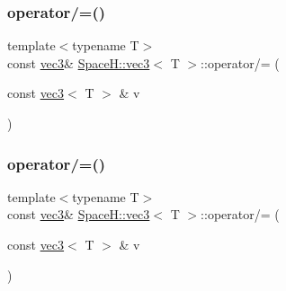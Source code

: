 \mbox{\label{struct_space_h_1_1vec3_a0de32a9762524bf50e592c5a463c29e2}} 
\subsubsection{\texorpdfstring{operator/=()}{operator/=()}\hspace{0.1cm}{\footnotesize\ttfamily [3/7]}}
{\footnotesize\ttfamily template$<$typename T$>$ \\
const \mbox{\hyperlink{struct_space_h_1_1vec3}{vec3}}\& \mbox{\hyperlink{struct_space_h_1_1vec3}{Space\+H\+::vec3}}$<$ T $>$\+::operator/= (\begin{DoxyParamCaption}\item[{const \mbox{\hyperlink{struct_space_h_1_1vec3}{vec3}}$<$ T $>$ \&}]{v }\end{DoxyParamCaption})\hspace{0.3cm}{\ttfamily [inline]}}

\mbox{\label{struct_space_h_1_1vec3_a0de32a9762524bf50e592c5a463c29e2}} 
\subsubsection{\texorpdfstring{operator/=()}{operator/=()}\hspace{0.1cm}{\footnotesize\ttfamily [4/7]}}
{\footnotesize\ttfamily template$<$typename T$>$ \\
const \mbox{\hyperlink{struct_space_h_1_1vec3}{vec3}}\& \mbox{\hyperlink{struct_space_h_1_1vec3}{Space\+H\+::vec3}}$<$ T $>$\+::operator/= (\begin{DoxyParamCaption}\item[{const \mbox{\hyperlink{struct_space_h_1_1vec3}{vec3}}$<$ T $>$ \&}]{v }\end{DoxyParamCaption})\hspace{0.3cm}{\ttfamily [inline]}}

\mbox{\label{struct_space_h_1_1vec3_afd7ec569421aa04734cebdb346b9bdbf}} 
